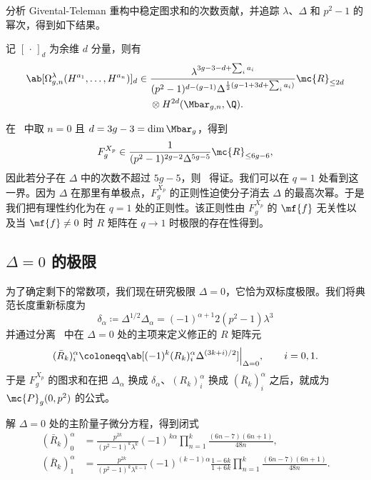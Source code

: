 分析 Givental-Teleman 重构中稳定图求和的次数贡献，并追踪 \(\lambda\)、\(\Delta\) 和 \(p^2-1\) 的幂次，得到如下结果。

\begin{thm}%
\label{thm:local P1 reconstruction}
    记 \([\,\cdot\,]_d\) 为余维 \(d\) 分量，则有
    \begin{align*}
        \ab[\Omega^{\lambda}_{g,n}(H^{a_1},\ldots,H^{a_n})]_d \in{}& \frac{\lambda^{3g-3-d+\sum_i a_i}}{(p^2-1)^{d-(g-1)}\Delta^{\frac{1}{2}(g-1+3d+\sum_i a_i)}}\mc{R}_{\leq 2d} \\
        &\otimes H^{2d}(\Mbar_{g,n},\Q).
    \end{align*}
\end{thm}

在~ 中取 \(n=0\) 且 \(d = 3g-3 = \dim \Mbar_g\)，得到
\[ F_g^{X_p} \in \frac{1}{(p^2-1)^{2g-2}\Delta^{5g-5}}\mc{R}_{\leq 6g-6}, \]
因此若分子在 \(\Delta\) 中的次数不超过 \(5g-5\)，则~ 得证。我们可以在 \(q=1\) 处看到这一界。因为 \(\Delta\) 在那里有单极点，\(F_g^{X_p}\) 的正则性迫使分子消去 \(\Delta\) 的最高次幂。于是我们把有理性约化为在 \(q=1\) 处的正则性。该正则性由 \(F_g^{X_p}\) 的 \(\mf{f}\) 无关性以及当 \(\mf{f} \neq 0\) 时 \(R\) 矩阵在 \(q \to 1\) 时极限的存在性得到。

\subsection{\(\Delta = 0\) 的极限}%
\label{sub:The limit Delta = 0}

为了确定剩下的常数项，我们现在研究极限 \(\Delta = 0\)，它恰为双标度极限。我们将典范长度重新标度为
\[ \delta_{\alpha} \coloneqq \Delta^{1/2}\Delta_{\alpha} = (-1)^{\alpha+1}2(p^2-1)\lambda^3 \]
并通过分离~ 中在 \(\Delta = 0\) 处的主项来定义修正的 \(R\) 矩阵元
\[ (\bar{R}_k)_i^{\alpha} \coloneqq \ab[(-1)^k (R_k)_i^{\alpha}\Delta^{(3k+i)/2}]\Big|_{\Delta=0}, \qquad i = 0,1. \]
于是 \(F_g^{X_p}\) 的图求和在把 \(\Delta_{\alpha}\) 换成 \(\delta_{\alpha}\)、\((R_k)_i^{\alpha}\) 换成 \((\bar{R}_k)_i^{\alpha}\) 之后，就成为 \(\mc{P}_g(0,p^2)\) 的公式。

\begin{lem}%
\label{lem:R matrix at Delta zero}
    解 \(\Delta = 0\) 处的主阶量子微分方程，得到闭式
    \begin{align*}
        (\bar{R}_k)_0^{\alpha} &= \frac{p^{2k}}{(p^2-1)^k\lambda^k}(-1)^{k\alpha}\prod_{n=1}^k \frac{(6n-7)(6n+1)}{48n}, \\
        (\bar{R}_k)_1^{\alpha} &= \frac{p^{2k}}{(p^2-1)^k \lambda^{k-1}}(-1)^{(k-1)\alpha}\frac{1-6k}{1+6k}\prod_{n=1}^k \frac{(6n-7)(6n+1)}{48n}.
    \end{align*}
\end{lem}

